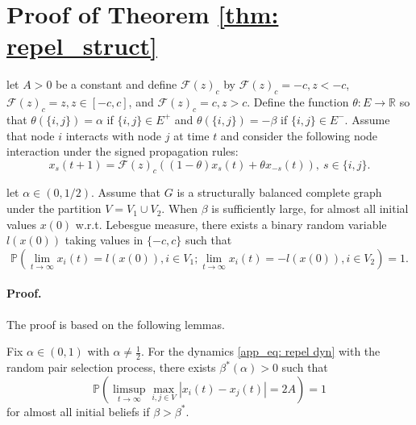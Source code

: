 \section{Proof of Theorem \ref{thm: repel_struct}}

\begin{theorem}
let \( A > 0 \) be a constant and define \( \mathcal{F}(z)_c \) by \( \mathcal{F}(z)_c = -c, z < -c \), \( \mathcal{F}(z)_c = z, z \in [-c, c] \), and \( \mathcal{F}(z)_c = c, z > c \). Define the function \( \theta : E \to \mathbb{R} \) so that \( \theta(\{i,j\}) = \alpha \) if \( \{i,j\} \in E^+ \) and \( \theta(\{i,j\}) = -\beta \) if \( \{i,j\} \in E^- \). 
Assume that node \( i \) interacts with node \( j \) at time \( t \) and consider the following node interaction under the signed propagation rules:
\begin{equation}
\label{app_eq: repel dyn}
    x_s(t + 1) = \mathcal{F}(z)_c((1 - \theta)x_s(t) + \theta x_{-s}(t)), \ s \in \{i,j\}.
\end{equation}

let \(\alpha \in (0,1/2)\). Assume that \(G\) is a structurally balanced complete graph under the partition \(V = V_1 \cup V_2\). 
When \(\beta\) is sufficiently large, for almost all initial values \(x(0)\) w.r.t. Lebesgue measure, there exists a binary random variable \(l(x(0))\) taking values in \(\{-c,c\}\) such that
\begin{equation}
    \mathbb{P}\left(\lim_{t \to \infty} x_i(t) = l(x(0)), i \in V_1; \lim_{t \to \infty} x_i(t) = -l(x(0)), i \in V_2 \right) = 1.
\end{equation}
\end{theorem}


\paragraph{Proof.}
The proof is based on the following lemmas.

\begin{lemma}
\label{ap_lemma: 2 bound}
Fix \(\alpha \in (0, 1)\) with \(\alpha \neq \frac{1}{2}\). For the dynamics \ref{app_eq: repel dyn} with the random pair selection process, there exists \(\beta^*(\alpha) > 0\) such that
\[
\mathbb{P}\left(\limsup_{t \to \infty} \max_{i,j \in V} |x_i(t) - x_j(t)| = 2A\right) = 1
\]
for almost all initial beliefs if \(\beta > \beta^*\).
\end{lemma}

